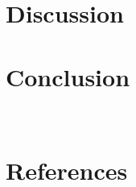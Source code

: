 \documentclass[a4paper]{jpconf} %
\begin{document}
\section{Discussion}
\label{ch:discussion}


\section{Conclusion}
\label{ch:conclusion}
\\

% 

%  


\section*{References}
   
  
\end{document}
